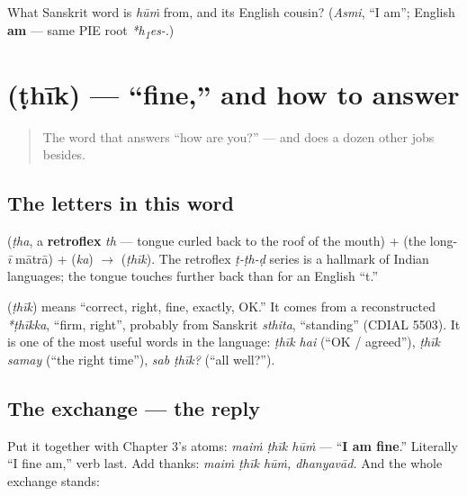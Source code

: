 \begin{tcolorbox}[breakable,colback=teal!4,colframe=teal!35!black,title={Before you move on}]
What Sanskrit word is \emph{hūṁ} from, and its English cousin? (\emph{Asmi}, \textquotedblleft{}I am\textquotedblright{}; English \textbf{am} — same PIE root \emph{*h\textsubscript{1}es-}.)
\end{tcolorbox}
\section[\texorpdfstring{\hi{ठीक} (ṭhīk)}{ठीक (ṭhīk)}]{ (ṭhīk) — \textquotedblleft{}fine,\textquotedblright{} and how to answer}

\label{lesson:HI-C03-thik}



\begin{quote}
The word that answers \textquotedblleft{}how are you?\textquotedblright{} — and does a dozen other jobs besides.
\end{quote}

\subsection*{The letters in this word}
\textbf{} (\emph{ṭha}, a \textbf{retroflex} \emph{th} — tongue curled back to the roof of the mouth) + \textbf{} (the long-\emph{ī} mātrā) + \textbf{} (\emph{ka}) $\to$ \textbf{} (\emph{ṭhīk}). The retroflex \emph{ṭ-ṭh-ḍ} series is a hallmark of Indian languages; the tongue touches further back than for an English \textquotedblleft{}t.\textquotedblright{}

\begin{cousinweb}
\textbf{} (\emph{ṭhīk}) means \textquotedblleft{}correct, right, fine, exactly, OK.\textquotedblright{} It comes from a reconstructed \emph{*ṭhīkka}, \textquotedblleft{}firm, right\textquotedblright{}, probably from Sanskrit \emph{sthita}, \textquotedblleft{}standing\textquotedblright{} (CDIAL 5503). It is one of the most useful words in the language: \emph{ṭhīk hai} (\textquotedblleft{}OK / agreed\textquotedblright{}), \emph{ṭhīk samay} (\textquotedblleft{}the right time\textquotedblright{}), \emph{sab ṭhīk?} (\textquotedblleft{}all well?\textquotedblright{}).
\end{cousinweb}

\subsection*{The exchange — the reply}
Put it together with Chapter 3's atoms: \emph{maiṁ ṭhīk hūṁ} — \textquotedblleft{}\textbf{I am fine}.\textquotedblright{} Literally \textquotedblleft{}I fine am,\textquotedblright{} verb last. Add thanks: \emph{maiṁ ṭhīk hūṁ, dhanyavād.} And the whole exchange stands:

